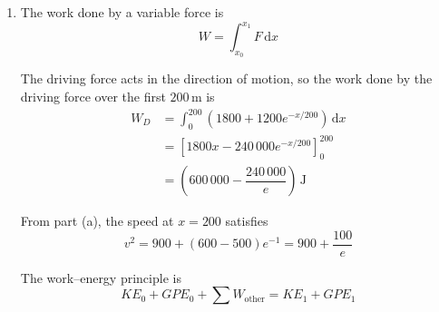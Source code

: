 \documentclass[leqno]{article}
\begin{document}
\begin{enumerate}[
  label=\textbf{\arabic*.},
  leftmargin=*,
  topsep=0pt,
  partopsep=0pt,
  parsep=0pt
]
\begin{djsSolution}
\begin{enumerate}[label=\textbf{(\alph*)}, start=1]
  With the substitution \(u=v^2\):
  \[
  \dfrac{\mathrm{d}u}{\mathrm{d}x}=2v\dfrac{\mathrm{d}v}{\mathrm{d}x}
  \]

  Hence the differential equation becomes
  \begin{align*}
  400\dfrac{\mathrm{d}u}{\mathrm{d}x}&=1800+1200e^{-x/200}-2u\\
  \dfrac{\mathrm{d}u}{\mathrm{d}x}+\dfrac{u}{200}&=\dfrac92+3e^{-x/200}
  \end{align*}

  The integrating factor is
  \[
  \mu(x)=e^{\int \frac{1}{200}\,\mathrm{d}x}=e^{x/200}
  \]

  Multiplying the equation by \(\mu(x)\) gives
  \[
  e^{x/200}\dfrac{\mathrm{d}u}{\mathrm{d}x}+\dfrac{1}{200}e^{x/200}u=\dfrac92e^{x/200}+3
  \]

  The left-hand side is the derivative of \(\mu(x)u\), so
  \[
  \dfrac{\mathrm{d}}{\mathrm{d}x}\left(ue^{x/200}\right)=\dfrac92e^{x/200}+3
  \]

  Integrating with respect to \(x\):
  \begin{align*}
  ue^{x/200}&=900e^{x/200}+3x+c\\
  u&=900+(3x+c)e^{-x/200}
  \end{align*}

  At the marker, \(x=0\) and \(u=20^2=400\), so
  \begin{align*}
  400&=900+c\\
  c&=-500
  \end{align*}

  Replacing \(u\) by \(v^2\):
  \[
  v^2=900+(3x-500)e^{-x/200}
  \]

  \item The work done by a variable force is
  \[
  W=\int_{x_0}^{x_1}F\,\mathrm{d}x
  \]

  The driving force acts in the direction of motion, so the work done by the driving force over the first \(200\,\mathrm{m}\) is
  \begin{align*}
  W_D&=\int_0^{200}\left(1800+1200e^{-x/200}\right)\,\mathrm{d}x\\
  &=\left[1800x-240\,000e^{-x/200}\right]_0^{200}\\
  &=\left(600\,000-\dfrac{240\,000}{e}\right)\,\mathrm{J}
  \end{align*}

  From part (a), the speed at \(x=200\) satisfies
  \[
  v^2=900+(600-500)e^{-1}=900+\dfrac{100}{e}
  \]

  The work--energy principle is
  \[
  KE_0+GPE_0+\sum W_{\text{other}}=KE_1+GPE_1
  \]


\end{enumerate}
\end{djsSolution}
\end{enumerate}
\end{document}
